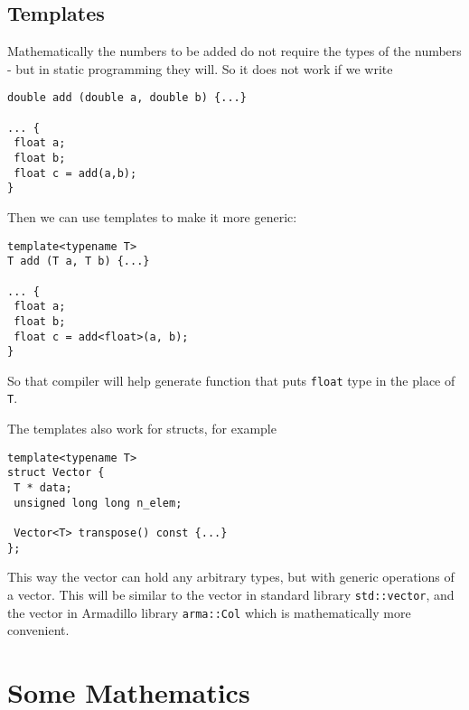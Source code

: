 \documentclass[12pt,a4paper,openany,twoside]{article}
\numberwithin{equation}{section}
\begin{document}
\subsection{Templates}
Mathematically the numbers to be added do not require the types of the numbers - but in static programming they will. So it does not work if we write
\begin{lstlisting}
double add (double a, double b) {...}

... {
 float a;
 float b;
 float c = add(a,b);
}
\end{lstlisting}

Then we can use templates to make it more generic:
\begin{lstlisting}
template<typename T>
T add (T a, T b) {...}

... {
 float a;
 float b;
 float c = add<float>(a, b);
}
\end{lstlisting}
So that compiler will help generate function that puts \lstinline{float} type in the place of \lstinline{T}.

The templates also work for structs, for example
\begin{lstlisting}
template<typename T>
struct Vector {
 T * data;
 unsigned long long n_elem;
 
 Vector<T> transpose() const {...}
};
\end{lstlisting}
This way the vector can hold any arbitrary types, but with generic operations of a vector. This will be similar to the vector in standard library \lstinline{std::vector}, and the vector in Armadillo library \lstinline{arma::Col} which is mathematically more convenient.

\section{Some Mathematics}
\end{document}
